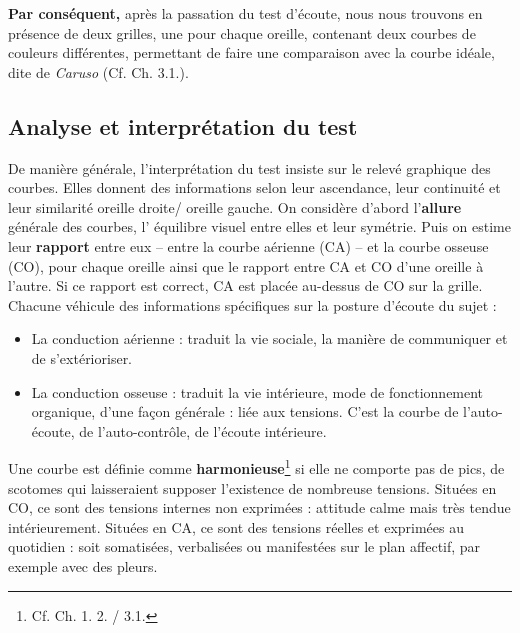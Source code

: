  \textbf{Par conséquent,} après la passation du test d\textquoteright écoute, nous nous
trouvons en présence de deux grilles, une  pour chaque oreille, contenant deux courbes
de couleurs différentes, permettant de faire une comparaison avec la courbe
 idéale, dite de \textit{Caruso} (Cf. Ch. 3.1.).

  
  
  
  

\subsection *{Analyse et interprétation du test}
De manière générale, l'interprétation du test insiste sur le relevé graphique
des
courbes. Elles donnent des informations selon leur ascendance, leur
continuité et leur similarité oreille droite/ oreille gauche.
On considère d'abord l'\textbf{allure }générale des courbes,
 l' équilibre visuel entre elles et leur symétrie.
Puis on estime
leur\textbf{ rapport} entre eux -- entre la courbe aérienne (CA) -- et la courbe osseuse (CO),
pour chaque oreille ainsi que le rapport entre CA et CO d\textquoteright une
oreille à l'autre. Si ce rapport est correct, CA est placée au-dessus
de CO sur la grille.
Chacune  véhicule des informations spécifiques
sur la posture d'écoute du sujet :
\begin{itemize}
\item La conduction aérienne : traduit la vie sociale, la manière de communiquer
et de s'extérioriser.
\item La conduction osseuse : traduit la vie intérieure, mode de fonctionnement
organique, d'une façon générale : liée aux tensions. C'est la courbe
de l\textquoteright auto-écoute, de l\textquoteright auto-contrôle,
de l'écoute intérieure.
\end{itemize}

Une courbe est définie comme \textbf{harmonieuse}\footnote{Cf. Ch. 1. 2. / 3.1.}
si elle ne comporte pas de
pics, de scotomes
qui laisseraient
supposer l'existence de nombreuse tensions.
Situées en CO, ce sont des tensions internes non exprimées : attitude
calme mais très tendue intérieurement.
Situées en CA, ce sont des tensions réelles et exprimées au quotidien
: soit somatisées, verbalisées ou manifestées sur le plan
affectif, par exemple avec des pleurs.

